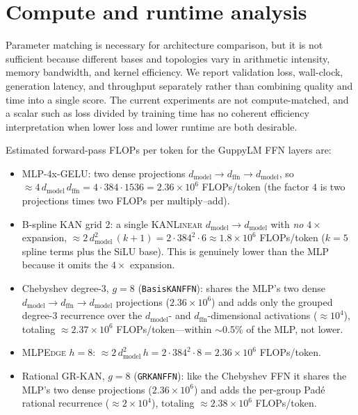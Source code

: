 \documentclass{article}
\newcommand{\modelname}[1]{\textsc{#1}}
\newcommand{\grkan}{\modelname{GR-KAN}}
\newcommand{\mlpedge}{\modelname{MLPEdge}}
\newcommand{\kanlinear}{\modelname{KANLinear}}
\begin{document}
\section{Compute and runtime analysis}
\label{app:compute}

Parameter matching is necessary for architecture comparison, but it is not sufficient because different bases and topologies vary in arithmetic intensity, memory bandwidth, and kernel efficiency. We report validation loss, wall-clock, generation latency, and throughput separately rather than combining quality and time into a single score. The current experiments are not compute-matched, and a scalar such as loss divided by training time has no coherent efficiency interpretation when lower loss and lower runtime are both desirable.

Estimated forward-pass FLOPs per token for the GuppyLM FFN layers are:
\begin{itemize}
\item MLP-4x-GELU: two dense projections \(d_{\mathrm{model}}\!\to\!d_{\mathrm{ffn}}\!\to\!d_{\mathrm{model}}\), so \(\approx 4\,d_{\mathrm{model}}\,d_{\mathrm{ffn}} = 4\cdot384\cdot1536 = 2.36\times10^6\) FLOPs/token (the factor \(4\) is two projections times two FLOPs per multiply--add).
\item B-spline KAN grid 2: a single \kanlinear{} \(d_{\mathrm{model}}\!\to\!d_{\mathrm{model}}\) with \emph{no} \(4\times\) expansion, \(\approx 2\,d_{\mathrm{model}}^2\,(k+1) = 2\cdot384^2\cdot6 \approx 1.8\times10^6\) FLOPs/token (\(k=5\) spline terms plus the SiLU base). This is genuinely lower than the MLP because it omits the \(4\times\) expansion.
\item Chebyshev degree-3, \(g=8\) (\texttt{BasisKANFFN}): shares the MLP's two dense \(d_{\mathrm{model}}\!\to\!d_{\mathrm{ffn}}\!\to\!d_{\mathrm{model}}\) projections (\(2.36\times10^6\)) and adds only the grouped degree-3 recurrence over the \(d_{\mathrm{model}}\)- and \(d_{\mathrm{ffn}}\)-dimensional activations (\(\approx 10^4\)), totaling \(\approx 2.37\times10^6\) FLOPs/token---within \(\sim\)0.5\% of the MLP, not lower.
\item \mlpedge{} \(h=8\): \(\approx 2\,d_{\mathrm{model}}^2\,h = 2\cdot384^2\cdot8 = 2.36\times10^6\) FLOPs/token.
\item Rational \grkan{}, \(g=8\) (\texttt{GRKANFFN}): like the Chebyshev FFN it shares the MLP's two dense projections (\(2.36\times10^6\)) and adds the per-group Pad\'{e} rational recurrence (\(\approx 2\times10^4\)), totaling \(\approx 2.38\times10^6\) FLOPs/token.
\end{itemize}
\end{document}
